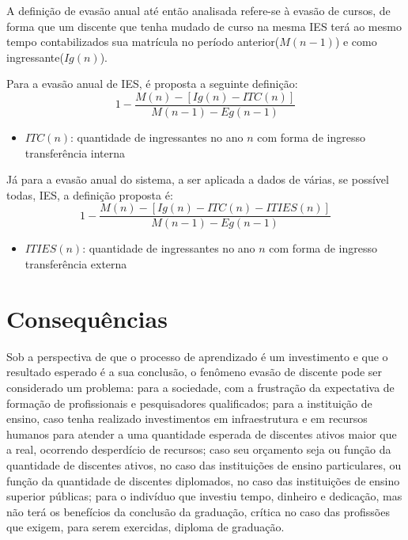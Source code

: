 A definição de evasão anual até então analisada refere-se à evasão de cursos, de forma que um discente que tenha mudado de curso na mesma IES terá ao mesmo tempo contabilizados sua matrícula no período anterior($M(n-1)$) e como ingressante($Ig(n)$).

Para a evasão anual de IES, é proposta a seguinte definição:
\begin{equation}
1 - \frac{M(n) - [Ig(n) - ITC(n)]}{M(n-1) - Eg(n-1)}
\end{equation}
\begin{itemize}
\item $ITC(n)$: quantidade de ingressantes no ano $n$ com forma de ingresso transferência interna
\end{itemize}

Já para a evasão anual do sistema, a ser aplicada a dados de várias, se possível todas, IES, a definição proposta é:
\begin{equation}
1 - \frac{M(n) - [Ig(n) - ITC(n) - ITIES(n)]}{M(n-1) - Eg(n-1)}
\end{equation}
\begin{itemize}
\item $ITIES(n)$: quantidade de ingressantes no ano $n$ com forma de ingresso transferência externa
\end{itemize}


\section{Consequências}

Sob a perspectiva de que o processo de aprendizado é um investimento e que o resultado esperado é a sua conclusão, o fenômeno evasão de discente pode ser considerado um problema: para a sociedade, com a frustração da expectativa de formação de profissionais e pesquisadores qualificados; para a instituição de ensino, caso tenha realizado investimentos em infraestrutura e em recursos humanos para atender a uma quantidade esperada de discentes ativos maior que a real, ocorrendo desperdício de recursos; caso seu orçamento seja ou função da quantidade de discentes ativos, no caso das instituições de ensino particulares, ou função da quantidade de discentes diplomados, no caso das instituições de ensino superior públicas; para o indivíduo que investiu tempo, dinheiro e dedicação, mas não terá os benefícios da conclusão da graduação, crítica no caso das profissões que exigem, para serem exercidas, diploma de graduação.

